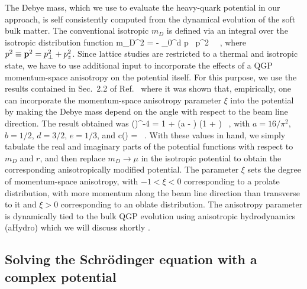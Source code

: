 The Debye mass, which we use to evaluate the heavy-quark potential in our approach, is self consistently computed from the dynamical evolution of the soft bulk matter. The conventional isotropic $m_D$ is defined via an integral over the isotropic distribution function
%
\be \label{eq:Debye}
m_D^2 = - \int_0^\infty d p \,
  p^2 \,  ~,
\ee
% 
where $p^2 \equiv {\bf p}^2 = p_\perp^2 +p_z^2$. Since lattice studies are restricted to a thermal and isotropic state, we have to use additional input to incorporate the effects of a QGP momentum-space anisotropy on the potential itself.  For this purpose, we use the results contained in Sec.~2.2 of Ref.~\cite{Strickland:2011aa} where it was shown that, empirically, one can incorporate the momentum-space anisotropy parameter $\xi$ into the potential by making the Debye mass depend on the angle with respect to the beam line direction.  The result obtained was
%
\be
\left(\right)^{-4} =  
1 + \xi\left(a - \right) 
\left(1 +  \right) \, ,
\label{eq:muparam}
\ee
%
with $a=16/\pi^2$, $b = 1/2$, $d=3/2$, $e=1/3$, and
%
\be
c(\theta) =  \, .
\ee
%
With these values in hand, we simply tabulate the real and imaginary parts of the potential functions with respect to $m_D$ and $r$, and then replace $m_D \rightarrow \mu$ in the isotropic potential to obtain the corresponding anisotropically modified potential. The parameter $\xi$ sets the degree of momentum-space anisotropy, with $-1 < \xi < 0$ corresponding to a prolate distribution, with more momentum along the beam line direction than transverse to it and $\xi >0$ corresponding to an oblate distribution.  The anisotropy parameter is dynamically tied to the bulk QGP evolution using anisotropic hydrodynamics (aHydro) which we will discuss shortly \cite{Martinez:2010sc,Florkowski:2010cf,Martinez:2010sd,Ryblewski:2010bs,Ryblewski:2011aq,Martinez:2012tu,Ryblewski:2012rr,Strickland:2014pga,Nopoush:2014pfa,Alqahtani:2015qja,Alqahtani:2016rth,Alqahtani:2017jwl,Alqahtani:2017tnq}.

\subsection{Solving the Schr\"odinger equation with a complex potential}
\label{ssec:schrod}

